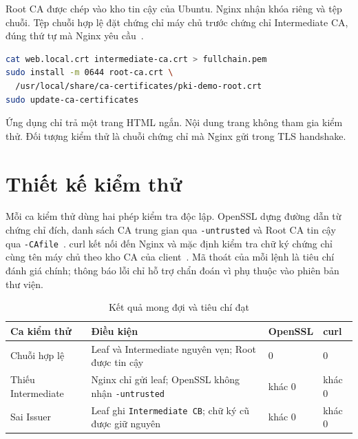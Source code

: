\documentclass[11pt,a4paper]{article}
\begin{document}
Root CA được chép vào kho tin cậy của Ubuntu.
Nginx nhận khóa riêng và tệp chuỗi.
Tệp chuỗi hợp lệ đặt chứng chỉ máy chủ trước chứng chỉ
Intermediate CA, đúng thứ tự mà Nginx yêu cầu~\cite{NginxHTTPS}.

\begin{lstlisting}[language=bash]
cat web.local.crt intermediate-ca.crt > fullchain.pem
sudo install -m 0644 root-ca.crt \
  /usr/local/share/ca-certificates/pki-demo-root.crt
sudo update-ca-certificates
\end{lstlisting}

Ứng dụng chỉ trả một trang HTML ngắn.
Nội dung trang không tham gia kiểm thử.
Đối tượng kiểm thử là chuỗi chứng chỉ mà Nginx gửi trong
TLS handshake.

\section{Thiết kế kiểm thử}

Mỗi ca kiểm thử dùng hai phép kiểm tra độc lập. OpenSSL dựng đường dẫn
từ chứng chỉ đích, danh sách CA trung gian qua \texttt{-untrusted} và
Root CA tin cậy qua \texttt{-CAfile}~\cite{OpenSSLVerify}. curl kết nối
đến Nginx và mặc định kiểm tra chữ ký chứng chỉ cùng tên máy chủ theo
kho CA của client~\cite{CurlTLSVerification}. Mã thoát của mỗi lệnh là
tiêu chí đánh giá chính; thông báo lỗi chỉ hỗ trợ chẩn đoán vì phụ thuộc
vào phiên bản thư viện.

\begin{table}[H]
    \centering
    \caption{Kết quả mong đợi và tiêu chí đạt}
    \label{tab:expected-results}
    \small
    \begin{tabularx}{\linewidth}{
        >{\raggedright\arraybackslash}p{2.8cm}
        >{\raggedright\arraybackslash}X
        >{\centering\arraybackslash}p{1.7cm}
        >{\centering\arraybackslash}p{1.3cm}
    }
        \toprule
        \textbf{Ca kiểm thử}
            & \textbf{Điều kiện}
            & \textbf{OpenSSL}
            & \textbf{curl} \\
        \midrule
        Chuỗi hợp lệ
            & Leaf và Intermediate nguyên vẹn; Root được tin cậy
            & $0$
            & $0$ \\
        Thiếu Intermediate
            & Nginx chỉ gửi leaf; OpenSSL không nhận
              \texttt{-untrusted}
            & khác $0$
            & khác $0$ \\
        Sai Issuer
            & Leaf ghi \texttt{Intermediate CB};
              chữ ký cũ được giữ nguyên
            & khác $0$
            & khác $0$ \\
        \bottomrule
    \end{tabularx}
\end{table}
\end{document}
